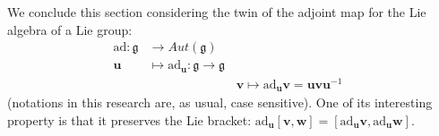 We conclude this section considering the twin of the adjoint map for the Lie algebra of a Lie group:
\begin{align*}
	\text{ad} :  \mathfrak{g} & \longrightarrow  Aut(\mathfrak{g}) &   \\
	\mathbf{u} &\longmapsto  \text{ad}_{\mathbf{u}}  : \mathfrak{g}  \longrightarrow  \mathfrak{g} \\
	& \qquad \qquad \qquad \quad \mathbf{v} \longmapsto \text{ad}_{\mathbf{u}}\mathbf{v} = \mathbf{u}\mathbf{v}\mathbf{u}^{-1}
\end{align*}
(notations in this research are, as usual, case sensitive). One of its interesting property is that it preserves the Lie bracket: $\text{ad}_{\mathbf{u}}[\mathbf{v}, \mathbf{w} ] = [\text{ad}_{\mathbf{u}} \mathbf{v}, \text{ad}_{\mathbf{u}} \mathbf{w} ]$.



